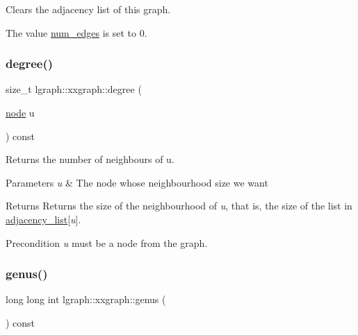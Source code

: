 Clears the adjacency list of this graph. 

The value \hyperlink{classlgraph_1_1xxgraph_a6765a9a3be42f6e0f824635c593b35d7}{num\+\_\+edges} is set to 0. \mbox{\label{classlgraph_1_1xxgraph_a20ebc2927ee8fb8bb0a2c3b448d9ed78}} 
\subsubsection{\texorpdfstring{degree()}{degree()}}
{\footnotesize\ttfamily size\+\_\+t lgraph\+::xxgraph\+::degree (\begin{DoxyParamCaption}\item[{\hyperlink{namespacelgraph_a397169dd66adf725210a30fb7251773e}{node}}]{u }\end{DoxyParamCaption}) const}



Returns the number of neighbours of u. 


\begin{DoxyParams}{Parameters}
{\em u} & The node whose neighbourhood size we want \\
\hline
\end{DoxyParams}
\begin{DoxyReturn}{Returns}
Returns the size of the neighbourhood of {\itshape u}, that is, the size of the list in \hyperlink{classlgraph_1_1xxgraph_a31cf82d0b20be05290be259dc97a51ec}{adjacency\+\_\+list}\mbox{[}{\itshape u}\mbox{]}. 
\end{DoxyReturn}
\begin{DoxyPrecond}{Precondition}
{\itshape u} must be a node from the graph. 
\end{DoxyPrecond}
\mbox{\label{classlgraph_1_1xxgraph_a5f48a91046766e3e0b71a3326f2b9153}} 
\subsubsection{\texorpdfstring{genus()}{genus()}}
{\footnotesize\ttfamily long long int lgraph\+::xxgraph\+::genus (\begin{DoxyParamCaption}{ }\end{DoxyParamCaption}) const}



